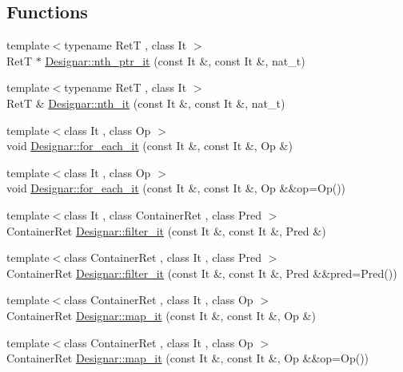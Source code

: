 \subsection*{Functions}
\begin{DoxyCompactItemize}
\item 
{\footnotesize template$<$typename RetT , class It $>$ }\\RetT $\ast$ \hyperlink{namespace_designar_a72ca73ad8bb829f0ea703a0bfa62414c}{Designar\+::nth\+\_\+ptr\+\_\+it} (const It \&, const It \&, nat\+\_\+t)
\item 
{\footnotesize template$<$typename RetT , class It $>$ }\\RetT \& \hyperlink{namespace_designar_a6009b5708fa05c048e3d11a5893165d1}{Designar\+::nth\+\_\+it} (const It \&, const It \&, nat\+\_\+t)
\item 
{\footnotesize template$<$class It , class Op $>$ }\\void \hyperlink{namespace_designar_a4e4d2731163735de1b313fbd6e888336}{Designar\+::for\+\_\+each\+\_\+it} (const It \&, const It \&, Op \&)
\item 
{\footnotesize template$<$class It , class Op $>$ }\\void \hyperlink{namespace_designar_a773f2843935a2d490b202240480d9e86}{Designar\+::for\+\_\+each\+\_\+it} (const It \&, const It \&, Op \&\&op=Op())
\item 
{\footnotesize template$<$class It , class Container\+Ret , class Pred $>$ }\\Container\+Ret \hyperlink{namespace_designar_a2e9a7f0c3737ea50acaaa849e78792ac}{Designar\+::filter\+\_\+it} (const It \&, const It \&, Pred \&)
\item 
{\footnotesize template$<$class Container\+Ret , class It , class Pred $>$ }\\Container\+Ret \hyperlink{namespace_designar_a0eadd36ecf06d087630130873fdc6a49}{Designar\+::filter\+\_\+it} (const It \&, const It \&, Pred \&\&pred=Pred())
\item 
{\footnotesize template$<$class Container\+Ret , class It , class Op $>$ }\\Container\+Ret \hyperlink{namespace_designar_afc87b7b7fbcaed27883b20975ff10e3a}{Designar\+::map\+\_\+it} (const It \&, const It \&, Op \&)
\item 
{\footnotesize template$<$class Container\+Ret , class It , class Op $>$ }\\Container\+Ret \hyperlink{namespace_designar_af22321d9c71f1bfa82df1e71f779dc86}{Designar\+::map\+\_\+it} (const It \&, const It \&, Op \&\&op=Op())

\end{DoxyCompactItemize}
